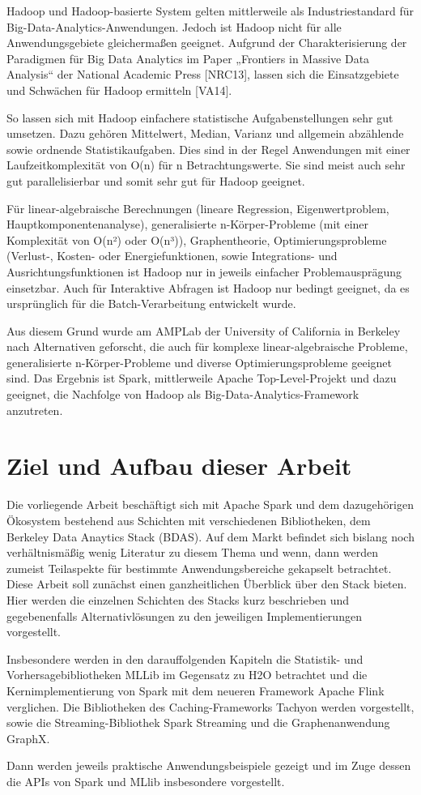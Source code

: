 Hadoop und Hadoop-basierte System gelten mittlerweile als Industriestandard für Big-Data-Analytics-Anwendungen. Jedoch ist Hadoop nicht für alle Anwendungsgebiete gleichermaßen geeignet. Aufgrund der Charakterisierung der Paradigmen für Big Data Analytics im Paper „Frontiers in Massive Data Analysis“ der National Academic Press [NRC13], lassen sich die Einsatzgebiete und Schwächen für Hadoop ermitteln [VA14].

So lassen sich mit Hadoop einfachere statistische Aufgabenstellungen sehr gut umsetzen. Dazu gehören Mittelwert, Median, Varianz und allgemein abzählende sowie ordnende Statistikaufgaben. Dies sind in der Regel Anwendungen mit einer Laufzeitkomplexität von O(n) für n Betrachtungswerte. Sie sind meist auch sehr gut parallelisierbar und somit sehr gut für Hadoop geeignet.    



Für linear-algebraische Berechnungen (lineare Regression, Eigenwertproblem, Hauptkomponentenanalyse), generalisierte n-Körper-Probleme (mit einer Komplexität 
von O(n²) oder O(n³)), Graphentheorie, Optimierungsprobleme (Verlust-, Kosten- oder Energiefunktionen, sowie  Integrations- und Ausrichtungsfunktionen ist Hadoop nur in jeweils einfacher Problemausprägung einsetzbar. Auch für Interaktive Abfragen ist Hadoop nur bedingt geeignet, da es ursprünglich für die Batch-Verarbeitung entwickelt wurde.

Aus diesem Grund wurde am AMPLab der University of California in Berkeley nach Alternativen geforscht, die auch für komplexe linear-algebraische Probleme, generalisierte n-Körper-Probleme und diverse Optimierungsprobleme geeignet sind. Das Ergebnis ist Spark, mittlerweile Apache Top-Level-Projekt und dazu geeignet, die Nachfolge von Hadoop als Big-Data-Analytics-Framework anzutreten. 

\section{Ziel und Aufbau dieser Arbeit}
\label{section:ziel dieser Arbeit}

Die vorliegende Arbeit beschäftigt sich mit Apache Spark und dem dazugehörigen Ökosystem bestehend aus Schichten  mit verschiedenen Bibliotheken, dem Berkeley Data Anaytics Stack (BDAS). Auf dem Markt befindet sich bislang noch verhältnismäßig wenig Literatur zu diesem Thema und wenn, dann werden zumeist Teilaspekte für bestimmte Anwendungsbereiche gekapselt betrachtet. Diese Arbeit soll zunächst einen ganzheitlichen Überblick über den Stack bieten. Hier werden die einzelnen Schichten des Stacks kurz beschrieben und gegebenenfalls Alternativlösungen zu den jeweiligen Implementierungen vorgestellt. 

Insbesondere werden in den darauffolgenden Kapiteln die Statistik- und Vorhersagebibliotheken MLLib im Gegensatz zu H2O betrachtet und die Kernimplementierung von Spark mit dem neueren Framework Apache Flink verglichen. Die Bibliotheken des Caching-Frameworks Tachyon werden vorgestellt, sowie die Streaming-Bibliothek Spark Streaming und die Graphenanwendung GraphX. 

Dann werden jeweils praktische Anwendungsbeispiele gezeigt und im Zuge dessen die APIs von Spark und MLlib insbesondere vorgestellt.   



